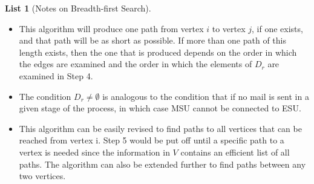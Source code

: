 \documentclass[10pt,]{book}
\theoremstyle{plain}
\theoremstyle{definition}
\theoremstyle{definition}
\theoremstyle{definition}
\theoremstyle{definition}
\theoremstyle{definition}
\newtheorem{listwrapper}[theorem]{List}
\numberwithin{equation}{section}
\begin{document}
\begin{listwrapper}[Notes on Breadth-first Search]\label{list-7}
\leavevmode%
\begin{itemize}[label=\textbullet]
\item{} This algorithm will produce one path from vertex \(i\) to vertex \(j\), if one exists, and that path will be as short as possible.
If more than one path of this length exists, then the one that is produced depends on the order in which the edges are examined and the order in
which the elements of \(D_r\) are examined in Step 4.%
\item{} The condition \(D_{r }\neq \emptyset\) is analogous to the condition that if no mail is sent in a given stage of the process, in which
case MSU cannot be connected to ESU.%
\item{} This algorithm can be easily revised to find paths to all vertices that can be reached from vertex i. Step 5 would be put off until a specific
path to a vertex is needed since the information in \(V\) contains an efficient list of all paths. The algorithm can also be extended further
to find paths between any two vertices.%
\end{itemize}
\end{listwrapper}
\end{document}
